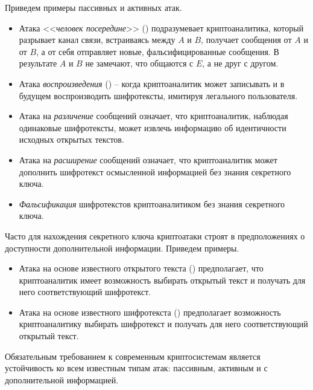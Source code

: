 Приведем примеры пассивных и активных атак.
\begin{itemize}
    \item Атака <<\emph{человек посередине}>> () подразумевает криптоаналитика, который разрывает канал связи, встраиваясь между $A$ и $B$, получает сообщения от $A$ и от $B$, а от себя отправляет новые, фальсифицированные сообщения. В результате $A$ и $B$ не замечают, что общаются с $E$, а не друг с другом.
    \item Атака \emph{воспроизведения} () -- когда криптоаналитик может записывать и в будущем воспроизводить шифротексты, имитируя легального пользователя.
    \item Атака на \emph{различение} сообщений означает, что криптоаналитик, наблюдая одинаковые шифротексты, может извлечь информацию об идентичности исходных открытых текстов.
    \item Атака на \emph{расширение} сообщений означает, что криптоаналитик может дополнить шифротекст осмысленной информацией без знания секретного ключа.
    \item \emph{Фальсификация} шифротекстов криптоаналитиком без знания секретного ключа.
\end{itemize}

Часто для нахождения секретного ключа криптоатаки строят в предположениях о доступности дополнительной информации. Приведем примеры.
\begin{itemize}
    \item Атака на основе известного открытого текста () предполагает, что криптоаналитик имеет возможность выбирать открытый текст и получать для него соответствующий шифротекст.
    \item Атака на основе известного шифротекста () предполагает возможность криптоаналитику выбирать шифротекст и получать для него соответствующий открытый текст.
\end{itemize}

Обязательным требованием к современным криптосистемам является устойчивость ко всем известным типам атак: пассивным, активным и с дополнительной информацией.


%

